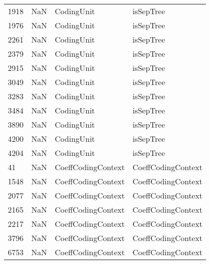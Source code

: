 \begin{tabular}{llll}
1918 &                   NaN &                 CodingUnit &                                 isSepTree \\
1976 &                   NaN &                 CodingUnit &                                 isSepTree \\
2261 &                   NaN &                 CodingUnit &                                 isSepTree \\
2379 &                   NaN &                 CodingUnit &                                 isSepTree \\
2915 &                   NaN &                 CodingUnit &                                 isSepTree \\
3049 &                   NaN &                 CodingUnit &                                 isSepTree \\
3283 &                   NaN &                 CodingUnit &                                 isSepTree \\
3484 &                   NaN &                 CodingUnit &                                 isSepTree \\
3890 &                   NaN &                 CodingUnit &                                 isSepTree \\
4200 &                   NaN &                 CodingUnit &                                 isSepTree \\
4204 &                   NaN &                 CodingUnit &                                 isSepTree \\
41   &                   NaN &         CoeffCodingContext &                        CoeffCodingContext \\
1548 &                   NaN &         CoeffCodingContext &                        CoeffCodingContext \\
2077 &                   NaN &         CoeffCodingContext &                        CoeffCodingContext \\
2165 &                   NaN &         CoeffCodingContext &                        CoeffCodingContext \\
2217 &                   NaN &         CoeffCodingContext &                        CoeffCodingContext \\
3796 &                   NaN &         CoeffCodingContext &                        CoeffCodingContext \\
6753 &                   NaN &         CoeffCodingContext &                        CoeffCodingContext \\

\end{tabular}

